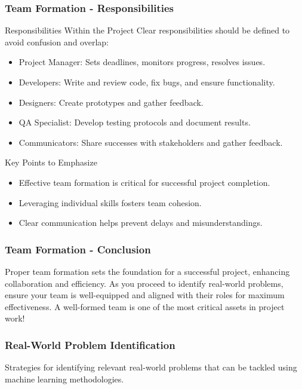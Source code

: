 \documentclass{beamer}
\begin{document}
\begin{frame}[fragile]
    \frametitle{Team Formation - Responsibilities}
    \begin{block}{Responsibilities Within the Project}
    Clear responsibilities should be defined to avoid confusion and overlap:
    \begin{itemize}
        \item Project Manager: Sets deadlines, monitors progress, resolves issues.
        \item Developers: Write and review code, fix bugs, and ensure functionality.
        \item Designers: Create prototypes and gather feedback.
        \item QA Specialist: Develop testing protocols and document results.
        \item Communicators: Share successes with stakeholders and gather feedback.
    \end{itemize}
    \end{block}
    
    \begin{block}{Key Points to Emphasize}
    \begin{itemize}
        \item Effective team formation is critical for successful project completion.
        \item Leveraging individual skills fosters team cohesion.
        \item Clear communication helps prevent delays and misunderstandings.
    \end{itemize}
    \end{block}
\end{frame}

\begin{frame}[fragile]
    \frametitle{Team Formation - Conclusion}
    Proper team formation sets the foundation for a successful project, enhancing collaboration and efficiency. As you proceed to identify real-world problems, ensure your team is well-equipped and aligned with their roles for maximum effectiveness. A well-formed team is one of the most critical assets in project work!
\end{frame}

\begin{frame}[fragile]
    \frametitle{Real-World Problem Identification}
    Strategies for identifying relevant real-world problems that can be tackled using machine learning methodologies.
\end{frame}
\end{document}
